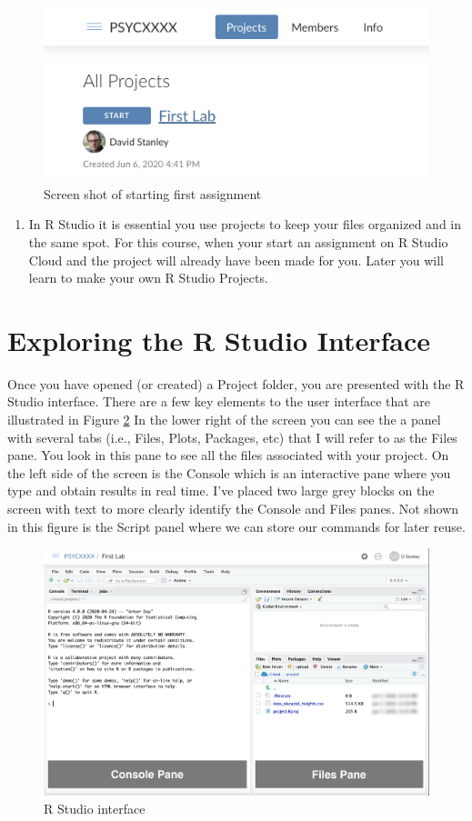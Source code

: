 \documentclass[
]{krantz}
\providecommand{\tightlist}{%
  \setlength{\itemsep}{0pt}\setlength{\parskip}{0pt}}
\begin{document}
\begin{figure}
\includegraphics[width=0.7\linewidth]{ch_introduction/images/screenshot_assignment} \caption{Screen shot of starting first assignment}\label{fig:assignment}
\end{figure}

\begin{enumerate}
\def\labelenumi{\arabic{enumi}.}
\setcounter{enumi}{4}
\tightlist
\item
  In R Studio it is essential you use projects to keep your files organized and in the same spot. For this course, when your start an assignment on R Studio Cloud and the project will already have been made for you. Later you will learn to make your own R Studio Projects.
\end{enumerate}

\hypertarget{exploring-the-r-studio-interface}{%
\section{Exploring the R Studio Interface}\label{exploring-the-r-studio-interface}}

Once you have opened (or created) a Project folder, you are presented with the R Studio interface. There are a few key elements to the user interface that are illustrated in Figure \ref{fig:interface} In the lower right of the screen you can see the a panel with several tabs (i.e., Files, Plots, Packages, etc) that I will refer to as the Files pane. You look in this pane to see all the files associated with your project. On the left side of the screen is the Console which is an interactive pane where you type and obtain results in real time. I've placed two large grey blocks on the screen with text to more clearly identify the Console and Files panes. Not shown in this figure is the Script panel where we can store our commands for later reuse.

\begin{figure}
\includegraphics[width=0.7\linewidth]{ch_introduction/images/screenshot_interface} \caption{R Studio interface}\label{fig:interface}
\end{figure}
\end{document}
